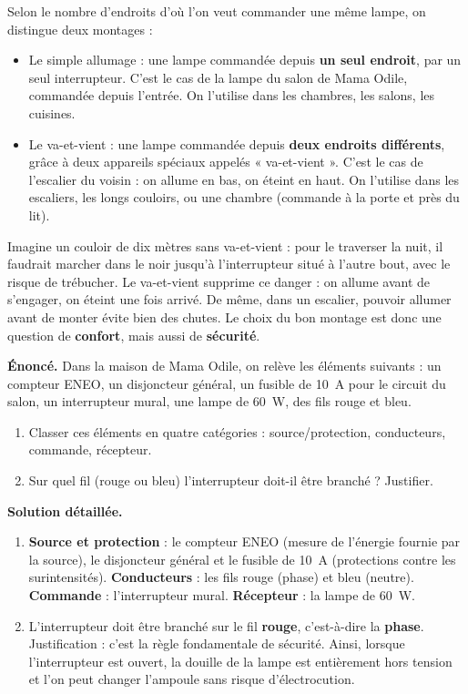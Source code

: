 \documentclass[11pt]{article}
\newcommand{\cle}[1]{{\popxbold\color{popdark}#1}}
\begin{document}
Selon le nombre d'endroits d'où l'on veut commander une même lampe, on distingue deux montages :

\begin{itemize}
\item Le \cle{simple allumage} : une lampe commandée depuis \textbf{un seul endroit}, par un seul interrupteur. C'est le cas de la lampe du salon de Mama Odile, commandée depuis l'entrée. On l'utilise dans les chambres, les salons, les cuisines.
\item Le \cle{va-et-vient} : une lampe commandée depuis \textbf{deux endroits différents}, grâce à deux appareils spéciaux appelés « va-et-vient ». C'est le cas de l'escalier du voisin : on allume en bas, on éteint en haut. On l'utilise dans les escaliers, les longs couloirs, ou une chambre (commande à la porte et près du lit).
\end{itemize}

\begin{exemplebox}
Imagine un couloir de dix mètres sans va-et-vient : pour le traverser la nuit, il faudrait marcher dans le noir jusqu'à l'interrupteur situé à l'autre bout, avec le risque de trébucher. Le va-et-vient supprime ce danger : on allume avant de s'engager, on éteint une fois arrivé. De même, dans un escalier, pouvoir allumer avant de monter évite bien des chutes. Le choix du bon montage est donc une question de \textbf{confort}, mais aussi de \textbf{sécurité}.
\end{exemplebox}

\begin{exoresolu}
\textbf{Énoncé.} Dans la maison de Mama Odile, on relève les éléments suivants : un compteur ENEO, un disjoncteur général, un fusible de \SI{10}{A} pour le circuit du salon, un interrupteur mural, une lampe de \SI{60}{W}, des fils rouge et bleu. 
\begin{enumerate}
\item Classer ces éléments en quatre catégories : source/protection, conducteurs, commande, récepteur.
\item Sur quel fil (rouge ou bleu) l'interrupteur doit-il être branché ? Justifier.
\end{enumerate}
\tcblower
\textbf{Solution détaillée.}
\begin{enumerate}
\item \textbf{Source et protection} : le compteur ENEO (mesure de l'énergie fournie par la source), le disjoncteur général et le fusible de \SI{10}{A} (protections contre les surintensités). \textbf{Conducteurs} : les fils rouge (phase) et bleu (neutre). \textbf{Commande} : l'interrupteur mural. \textbf{Récepteur} : la lampe de \SI{60}{W}.
\item L'interrupteur doit être branché sur le fil \textbf{rouge}, c'est-à-dire la \textbf{phase}. Justification : c'est la règle fondamentale de sécurité. Ainsi, lorsque l'interrupteur est ouvert, la douille de la lampe est entièrement hors tension et l'on peut changer l'ampoule sans risque d'électrocution.
\end{enumerate}
\end{exoresolu}
\end{document}
